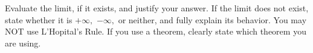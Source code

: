 \documentclass[addpoints,12pt]{exam}
\begin{document}
\begin{questions}




\question Evaluate the limit, if it exists, and justify your answer. If the limit does not exist, state
whether it is $+\infty,$ $-\infty,$ or neither, and fully explain its behavior. You may NOT use
L'Hopital's Rule. If you use a theorem, clearly state which theorem you are using.

\end{questions}
\end{document}
